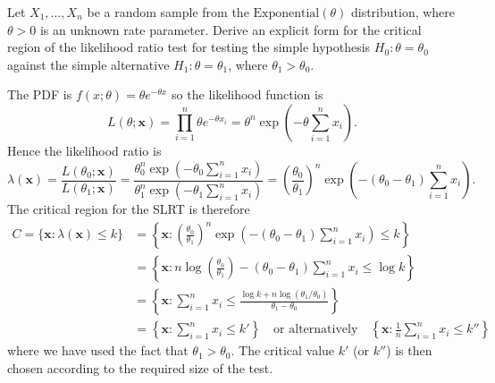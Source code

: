 \begin{example}
Let $X_1,\ldots,X_n$ be a random sample from the $\text{Exponential}(\theta)$ distribution, where $\theta>0$ is an unknown rate parameter. Derive an explicit form for the critical region of the likelihood ratio test for testing the simple hypothesis $H_0:\theta=\theta_0$ against the simple alternative $H_1:\theta=\theta_1$, where $\theta_1 > \theta_0$.
\begin{solution}
The PDF is $f(x;\theta) = \theta e^{-\theta x}$ so the likelihood function is
\[
L(\theta;\mathbf{x}) = \prod_{i=1}^n \theta e^{-\theta x_i} = \theta^n \exp\left(-\theta\sum_{i=1}^n x_i\right).
\]
Hence the likelihood ratio is
\[
\lambda(\mathbf{x})
	= \frac{L(\theta_0;\mathbf{x})}{L(\theta_1;\mathbf{x})} 
	= \frac{\theta_0^n \exp\left(-\theta_0\sum_{i=1}^n x_i\right)}{\theta_1^n \exp\left(-\theta_1\sum_{i=1}^n x_i\right)}
	= \left(\frac{\theta_0}{\theta_1}\right)^n \exp\left(-(\theta_0-\theta_1)\sum_{i=1}^n x_i\right).
\]
The critical region for the SLRT is therefore
\begin{align*}
C = \{\mathbf{x}:\lambda(\mathbf{x}) \leq k\} 
	& = \left\{\mathbf{x}:\left(\frac{\theta_0}{\theta_1}\right)^n\exp\left(-(\theta_0-\theta_1)\sum_{i=1}^n x_i\right) \leq k\right\} \\
	& = \left\{\mathbf{x}: n\log\left(\frac{\theta_0}{\theta_1}\right) - (\theta_0-\theta_1)\sum_{i=1}^n x_i \leq \log k \right\} \\
	& = \left\{\mathbf{x}: \sum_{i=1}^n x_i \leq \frac{\log k + n\log(\theta_1/\theta_0)}{\theta_1-\theta_0} \right\}\\
	& = \left\{\mathbf{x}: \sum_{i=1}^n x_i \leq k' \right\} \quad\text{or alternatively}\quad \left\{\mathbf{x}: \frac{1}{n}\sum_{i=1}^n x_i \leq k'' \right\}
\end{align*}
where we have used the fact that $\theta_1 > \theta_0$. The critical value $k'$ (or $k''$) is then chosen according to the required size of the test.
\end{solution}
\end{example}


